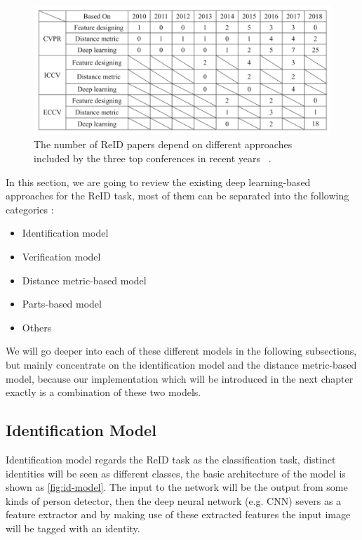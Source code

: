 \begin{figure}
    \includegraphics[width=\linewidth]{figures/papers_trend.png}
    \caption{The number of ReID papers depend on different approaches included
    by the three top conferences in recent years
    ~\protect\cite{survey-on-dl-for-reid-2019}.}
    \label{fig:papers-trend}
\end{figure}

In this section, we are going to review the existing deep learning-based approaches
for the ReID task, most of them can be separated into the following categories
\cite{survey-on-dl-for-reid-2019}:

\begin{itemize}
    \item Identification model
    \item Verification model
    \item Distance metric-based model
    \item Parts-based model
    \item Others
\end{itemize}

We will go deeper into each of these different models in the following
subsections, but mainly concentrate on the identification model and the
distance metric-based model, because our implementation which will be
introduced in the next chapter exactly is a combination of these two models.


\subsection{Identification Model}
\label{sec:related-work-re-id-idm}

Identification model regards the ReID task as the classification task, distinct
identities will be seen as different classes, the basic architecture of the model
is shown as \autoref{fig:id-model}. The input to the
network will be the output from some kinds of person detector, then the deep
neural network (e.g. CNN) severs as a feature extractor and by making use of these
extracted features the input image will be tagged
with an identity.

